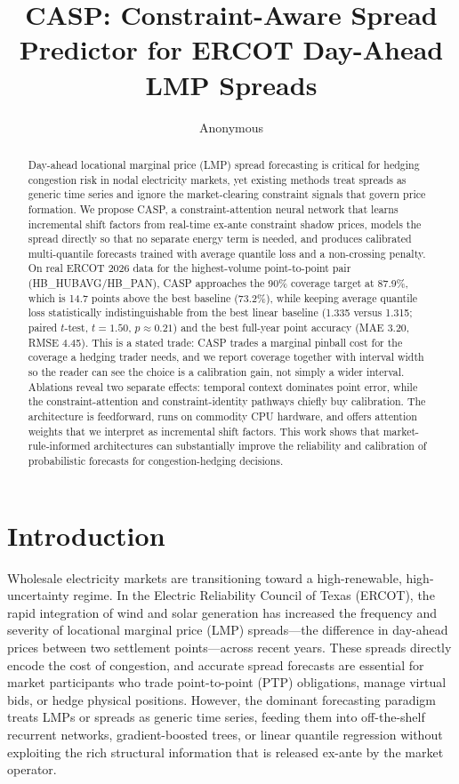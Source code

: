 \documentclass{article}
\title{CASP: Constraint-Aware Spread Predictor for ERCOT Day-Ahead LMP Spreads}
\author{Anonymous}
\begin{document}
\begin{abstract}
Day-ahead locational marginal price (LMP) spread forecasting is critical for hedging congestion risk in nodal electricity markets, yet existing methods treat spreads as generic time series and ignore the market-clearing constraint signals that govern price formation. We propose CASP, a constraint-attention neural network that learns incremental shift factors from real-time ex-ante constraint shadow prices, models the spread directly so that no separate energy term is needed, and produces calibrated multi-quantile forecasts trained with average quantile loss and a non-crossing penalty. On real ERCOT 2026 data for the highest-volume point-to-point pair (HB\_HUBAVG/HB\_PAN), CASP approaches the 90\% coverage target at 87.9\%, which is 14.7 points above the best baseline (73.2\%), while keeping average quantile loss statistically indistinguishable from the best linear baseline (1.335 versus 1.315; paired $t$-test, $t=1.50$, $p \approx 0.21$) and the best full-year point accuracy (MAE 3.20, RMSE 4.45). This is a stated trade: CASP trades a marginal pinball cost for the coverage a hedging trader needs, and we report coverage together with interval width so the reader can see the choice is a calibration gain, not simply a wider interval. Ablations reveal two separate effects: temporal context dominates point error, while the constraint-attention and constraint-identity pathways chiefly buy calibration. The architecture is feedforward, runs on commodity CPU hardware, and offers attention weights that we interpret as incremental shift factors. This work shows that market-rule-informed architectures can substantially improve the reliability and calibration of probabilistic forecasts for congestion-hedging decisions.
\end{abstract}

\maketitle

\section{Introduction}
\label{sec:introduction}

Wholesale electricity markets are transitioning toward a high-renewable, high-uncertainty regime. In the Electric Reliability Council of Texas (ERCOT), the rapid integration of wind and solar generation has increased the frequency and severity of locational marginal price (LMP) spreads---the difference in day-ahead prices between two settlement points---across recent years. These spreads directly encode the cost of congestion, and accurate spread forecasts are essential for market participants who trade point-to-point (PTP) obligations, manage virtual bids, or hedge physical positions. However, the dominant forecasting paradigm treats LMPs or spreads as generic time series, feeding them into off-the-shelf recurrent networks, gradient-boosted trees, or linear quantile regression without exploiting the rich structural information that is released ex-ante by the market operator.
\end{document}
